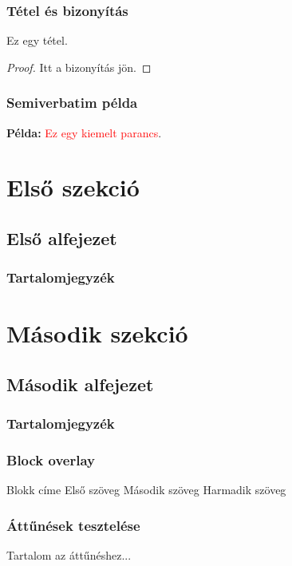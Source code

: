\documentclass[12pt,aspectratio=169]{beamer}
\begin{document}
\begin{frame}
  \frametitle{Tétel és bizonyítás}
  \begin{theorem}
    Ez egy tétel.
  \end{theorem}

  \begin{proof}
    Itt a bizonyítás jön.
  \end{proof}
\end{frame}

\begin{frame}[fragile]
  \frametitle{Semiverbatim példa}
  \begin{semiverbatim}
  \textbf{Példa:} \textcolor{red}{Ez egy kiemelt parancs}. 
  \end{semiverbatim}
\end{frame}

\section{Első szekció}
\subsection{Első alfejezet}

\begin{frame}
  \frametitle{Tartalomjegyzék}
  \tableofcontents[currentsection]
\end{frame}

\section{Második szekció}
\subsection{Második alfejezet}

\begin{frame}
  \frametitle{Tartalomjegyzék}
  \tableofcontents[currentsection]
\end{frame}

\begin{frame}
  \frametitle{Block overlay}
  \begin{block}{Blokk címe}
    Első szöveg \pause
    Második szöveg \pause
    Harmadik szöveg
  \end{block}
\end{frame}

\begin{frame}
  \frametitle{Áttűnések tesztelése}
  \transfade
  Tartalom az áttűnéshez...
\end{frame}
\end{document}
